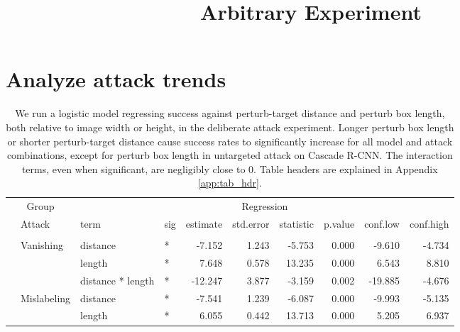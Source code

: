 \documentclass[
]{article}
\title{Arbitrary Experiment}
\author{}
\date{\vspace{-2.5em}}
\begin{document}
\maketitle

\section{Analyze attack trends}\label{analyze-attack-trends}

\begingroup\fontsize{9}{11}\selectfont

\begin{longtable}[t]{llllrrrrrr}
\caption{\label{tab:arbitrary_trend_table}We run a logistic model regressing success against perturb-target distance and perturb box length, both relative to image width or height, in the deliberate attack experiment. Longer perturb box length or shorter perturb-target distance cause success rates to significantly increase for all model and attack combinations, except for perturb box length in untargeted attack on Cascade R-CNN. The interaction terms, even when significant, are negligibly close to 0. Table headers are explained in Appendix \ref{app:tab_hdr}.}\\
\toprule
\multicolumn{2}{c}{Group} & \multicolumn{8}{c}{Regression} \\
\cmidrule(l{3pt}r{3pt}){1-2} \cmidrule(l{3pt}r{3pt}){3-10}
 & Attack & term & sig & estimate & std.error & statistic & p.value & conf.low & conf.high\\
\midrule
\addlinespace[0.3em]
\multicolumn{10}{l}{\textbf{YOLOv3}}\\
\hspace{1em} & Vanishing & distance & * & -7.152 & 1.243 & -5.753 & 0.000 & -9.610 & -4.734\\
\cmidrule{3-10}\nopagebreak
\hspace{1em} &  & length & * & 7.648 & 0.578 & 13.235 & 0.000 & 6.543 & 8.810\\
\cmidrule{3-10}\nopagebreak
\hspace{1em} &  & distance * length & * & -12.247 & 3.877 & -3.159 & 0.002 & -19.885 & -4.676\\
\cmidrule{2-10}\nopagebreak
\hspace{1em} & Mislabeling & distance & * & -7.541 & 1.239 & -6.087 & 0.000 & -9.993 & -5.135\\
\cmidrule{3-10}\nopagebreak
\hspace{1em} &  & length & * & 6.055 & 0.442 & 13.713 & 0.000 & 5.205 & 6.937\\

\end{longtable}
\end{document}
